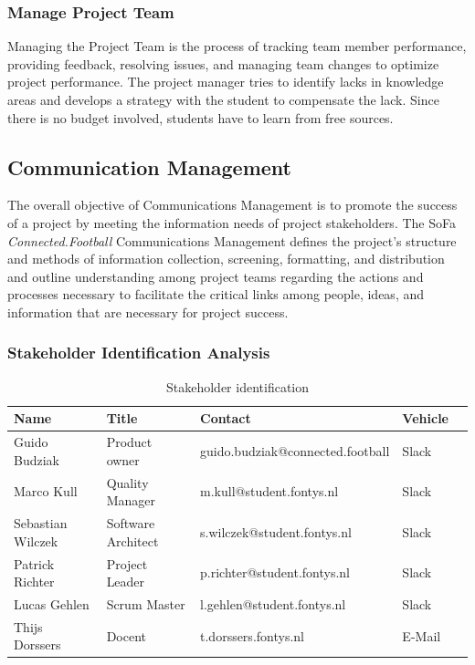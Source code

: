 \subsubsection{Manage Project Team}
\label{sssec:manage_project_team}

Managing the Project Team is the process of tracking team member performance, providing feedback, resolving
issues, and managing team changes to optimize project performance. The project manager tries to identify lacks in knowledge areas and develops a strategy with the student to compensate the lack. Since there is no budget involved, students have to learn from free sources.



\subsection{Communication Management}
\label{ssec:communication_management}

The overall objective of  Communications Management is to promote the success of a project by meeting the information needs of project stakeholders. The SoFa \textit{Connected.Football} Communications Management defines the project’s structure and methods of information collection, screening, formatting, and distribution and outline understanding among project teams regarding the actions and processes necessary to facilitate the critical links among people, ideas, and information that are necessary for project success.
 
\subsubsection{Stakeholder Identification Analysis}
\label{sssec:stakeholder_identification_analysis}

\begin{table}[H]
    \centering
    \begin{tabular}{|l|l|l|l|l|}
        \hline
        \cellcolor{gray}Name & \cellcolor{gray}Title & \cellcolor{gray}Contact & \cellcolor{gray}Vehicle \\ \hline
        Guido Budziak & Product owner & guido.budziak@connected.football & Slack  \\ \hline
        Marco Kull & Quality Manager & m.kull@student.fontys.nl & Slack    \\ \hline
        Sebastian Wilczek & Software Architect & s.wilczek@student.fontys.nl & Slack   \\ \hline
        Patrick Richter & Project Leader & p.richter@student.fontys.nl & Slack \\ \hline
        Lucas Gehlen & Scrum Master & l.gehlen@student.fontys.nl & Slack   \\ \hline
        Thijs Dorssers & Docent & t.dorssers.fontys.nl & E-Mail   \\ \hline
    \end{tabular}
    \caption{Stakeholder identification}
    \label{tab:stakeholder_identification}
\end{table}

